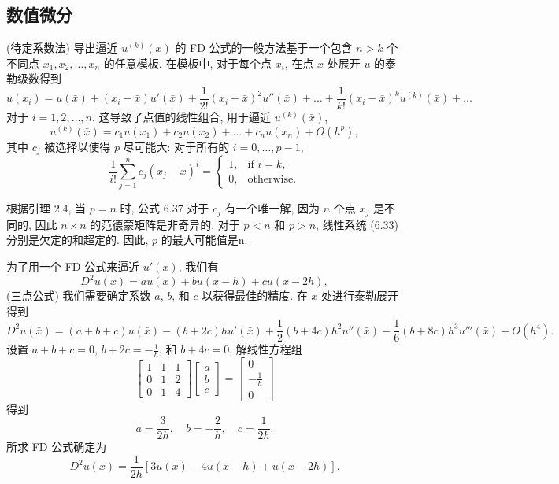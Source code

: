 \documentclass[a4paper]{ctexart}
\newcommand{\hl}[1]
{\noindent {\bf {#1}}}
\begin{document}
{\subsection{数值微分}

\hl{公式 6.37} (待定系数法) 导出逼近 $u^{(k)}(\bar{x})$ 的 FD 
公式的一般方法基于一个包含 $n > k$ 个不同点 $x_1, x_2, \ldots, x_n$ 的任意模板. 
在模板中, 对于每个点 $x_i$, 在点 $\bar{x}$ 处展开 $u$ 的泰勒级数得到
$$
u(x_i) = u(\bar{x}) + (x_i - \bar{x})u'(\bar{x}) 
+ \frac{1}{2!}(x_i - \bar{x})^2u''(\bar{x}) + \ldots 
+ \frac{1}{k!}(x_i - \bar{x})^ku^{(k)}(\bar{x}) + \ldots
$$
对于 $i = 1, 2, \ldots, n$. 
这导致了点值的线性组合, 用于逼近 $u^{(k)}(\bar{x})$, 
$$
u^{(k)}(\bar{x}) = c_1u(x_1) + c_2u(x_2) + \ldots + c_nu(x_n) + O(h^p),
$$
其中 $c_j$ 被选择以使得 $p$ 尽可能大:
对于所有的 $i = 0, \ldots, p - 1$, 
$$
\frac{1}{i!} \sum_{j = 1}^{n}c_j (x_j - \bar{x})^i 
= \begin{cases} 1, & \text{if } i = k, \\ 0, & \text{otherwise}.\end{cases}
$$

根据引理 2.4, 当 $p = n$ 时, 公式 6.37 对于 $c_j$ 有一个唯一解, 
因为 $n$ 个点 $x_j$ 是不同的, 因此 $n \times n$ 的范德蒙矩阵是非奇异的. 
对于 $p < n$ 和 $p > n$, 线性系统 (6.33) 分别是欠定的和超定的. 因此, $p$ 的最大可能值是n. 

\hl{Example 6.38} 为了用一个 FD 公式来逼近 $u'(\bar{x})$, 我们有
$$
D^2 u(\bar{x}) = a u(\bar{x}) + b u(\bar{x} - h) + c u(\bar{x} - 2h),
$$
(三点公式) 我们需要确定系数 $a$, $b$, 和 $c$ 以获得最佳的精度. 
在 $\bar{x}$ 处进行泰勒展开得到
$$
D^2u(\bar{x}) = (a + b + c) u(\bar{x}) - (b + 2c)h u'(\bar{x}) 
+ \frac{1}{2}(b + 4c)h^2u''(\bar{x}) 
- \frac{1}{6}(b + 8c)h^3u'''(\bar{x}) + O(h^4).
$$
设置 $a + b + c = 0$, $b + 2c = -\frac{1}{h}$, 和 $b + 4c = 0$, 
解线性方程组
$$
\begin{bmatrix}
1 & 1 & 1 \\
0 & 1 & 2 \\
0 & 1 & 4
\end{bmatrix}
\begin{bmatrix}
a \\
b \\
c
\end{bmatrix}
=
\begin{bmatrix}
0 \\
-\frac{1}{h} \\
0
\end{bmatrix}
$$
得到
$$
a = \frac{3}{2h}, \quad b = -\frac{2}{h}, \quad c = \frac{1}{2h}. 
$$
所求 FD 公式确定为
$$
D^2u(\bar{x}) = \frac{1}{2h}[3u(\bar{x}) - 4u(\bar{x} - h) + u(\bar{x} - 2h)]. 
$$

}
\end{document}
